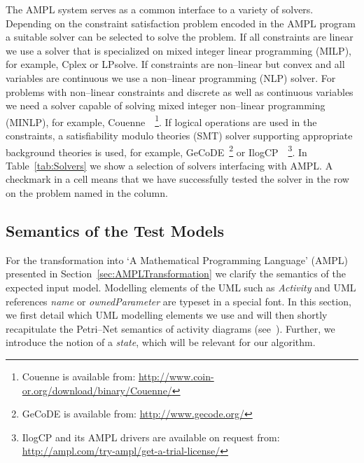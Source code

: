 \documentclass[runningheads,a4paper]{llncs}%
\newcommand{\UMLType}[1]{\textsf{\textit{#1}}} %
\newcommand{\UMLReference}[1]{\textsf{\textit{#1}}} %
\begin{document}
The AMPL system serves as a common interface to a variety of solvers. Depending
on the constraint satisfaction problem encoded in the AMPL program a suitable
solver can be selected to solve the problem. If all constraints are linear we
use a solver that is specialized on mixed integer linear programming (MILP), for
example, Cplex or LPsolve. If constraints are non--linear but convex and all
variables are continuous we use a non--linear programming (NLP) solver. For
problems with non--linear constraints and discrete as well as continuous
variables we need a solver capable of solving mixed integer non--linear
programming (MINLP), for example,
Couenne~\cite{Belotti09couenne}~\footnote{Couenne is available from:
\href{http://www.coin-or.org/download/binary/Couenne/}{http://www.coin-or.org/download/binary/Couenne/}}.
If logical operations are used in the constraints, a satisfiability modulo
theories (SMT) solver supporting appropriate background theories is used, for
example, GeCoDE~\footnote{GeCoDE is available from:
\href{http://www.gecode.org/}{http://www.gecode.org/}} or
IlogCP~\cite{ilogcp}~\footnote{IlogCP and its AMPL drivers are available on
request from:
\href{http://ampl.com/try-ampl/get-a-trial-license/}{http://ampl.com/try-ampl/get-a-trial-license/}}.
In Table~\ref{tab:Solvers} we show a selection of solvers interfacing with AMPL.
A checkmark in a cell means that we have successfully tested the solver in the
row on the problem named in the column.%
%
\subsection{Semantics of the Test Models}%
\label{sec:TestModel}%
For the transformation into `A Mathematical Programming Language' (AMPL)
presented in Section~\ref{sec:AMPLTransformation} we clarify the semantics of
the expected input model. Modelling elements of the UML such as
\UMLType{Activity} and UML references \UMLReference{name} or
\UMLReference{ownedParameter} are typeset in a special font. In this section, we
first detail which UML modelling elements we use and will then shortly
recapitulate the Petri--Net semantics of activity diagrams
(see~\cite{UML23Superstructure}). Further, we introduce the notion of a
\emph{state}, which will be relevant for our algorithm.
\end{document}
